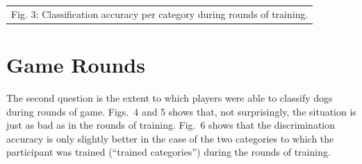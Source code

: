 \documentclass{article}
\begin{document}
\begin{tabular}{cc}
\multicolumn{2}{c}{Fig. 3: Classification accuracy per category during rounds of training.}
\end{tabular}

\newpage

\section{Game Rounds}
The second question is the extent to which players were able to classify dogs during rounds of game. Figs.~4 and 5 shows that, not surprisingly, the situation is just as bad as in the rounds of training. Fig.~6 shows that the discrimination accuracy is only slightly better in the case of the two categories to which the participant was trained (``trained categories'') during the rounds of training. 

\ 
\end{document}
